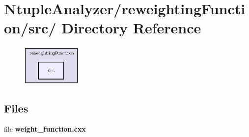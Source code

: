 \section{Ntuple\-Analyzer/reweighting\-Function/src/ Directory Reference}
\label{dir_bd629fd90a7a34201a82f63d1a86156b}


\begin{figure}[H]
\begin{center}
\leavevmode
\includegraphics[width=85pt]{dir_bd629fd90a7a34201a82f63d1a86156b_dep}
\end{center}
\end{figure}
\subsection*{Files}
\begin{CompactItemize}
\item 
file \textbf{weight\_\-function.cxx}
\end{CompactItemize}
